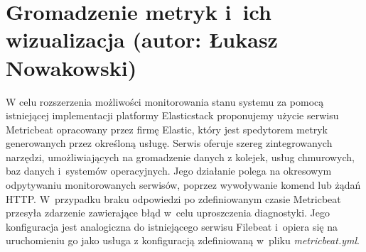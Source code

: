 \section{Gromadzenie metryk i~ich wizualizacja (autor: Łukasz Nowakowski)}
W celu rozszerzenia możliwości monitorowania stanu systemu za pomocą istniejącej implementacji platformy Elasticstack proponujemy użycie serwisu Metricbeat opracowany przez firmę Elastic, który jest spedytorem metryk generowanych przez określoną usługę. Serwis oferuje szereg zintegrowanych narzędzi, umożliwiających na gromadzenie danych z kolejek, usług chmurowych, baz danych i~systemów operacyjnych\cite{metricbeat}. Jego działanie polega na okresowym odpytywaniu monitorowanych serwisów, poprzez wywoływanie komend lub żądań HTTP. W~przypadku braku odpowiedzi po zdefiniowanym czasie Metricbeat przesyła zdarzenie zawierające błąd w~celu uproszczenia diagnostyki\cite{metricbeat_work}. Jego konfiguracja jest analogiczna do istniejącego serwisu Filebeat i~opiera się na uruchomieniu go jako usługa z konfiguracją zdefiniowaną w~pliku \textit{metricbeat.yml}.
